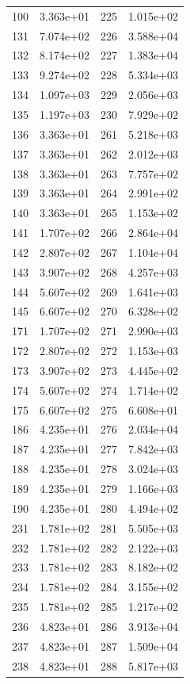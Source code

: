 \documentclass[12pt]{article}
\begin{document}
\begin{longtable}{@{}cccc@{}}
100 & 3.363e+01 & 225 & 1.015e+02 \\
131 & 7.074e+02 & 226 & 3.588e+04 \\
132 & 8.174e+02 & 227 & 1.383e+04 \\
133 & 9.274e+02 & 228 & 5.334e+03 \\
134 & 1.097e+03 & 229 & 2.056e+03 \\
135 & 1.197e+03 & 230 & 7.929e+02 \\
136 & 3.363e+01 & 261 & 5.218e+03 \\
137 & 3.363e+01 & 262 & 2.012e+03 \\
138 & 3.363e+01 & 263 & 7.757e+02 \\
139 & 3.363e+01 & 264 & 2.991e+02 \\
140 & 3.363e+01 & 265 & 1.153e+02 \\
141 & 1.707e+02 & 266 & 2.864e+04 \\
142 & 2.807e+02 & 267 & 1.104e+04 \\
143 & 3.907e+02 & 268 & 4.257e+03 \\
144 & 5.607e+02 & 269 & 1.641e+03 \\
145 & 6.607e+02 & 270 & 6.328e+02 \\
171 & 1.707e+02 & 271 & 2.990e+03 \\
172 & 2.807e+02 & 272 & 1.153e+03 \\
173 & 3.907e+02 & 273 & 4.445e+02 \\
174 & 5.607e+02 & 274 & 1.714e+02 \\
175 & 6.607e+02 & 275 & 6.608e+01 \\
186 & 4.235e+01 & 276 & 2.034e+04 \\
187 & 4.235e+01 & 277 & 7.842e+03 \\
188 & 4.235e+01 & 278 & 3.024e+03 \\
189 & 4.235e+01 & 279 & 1.166e+03 \\
190 & 4.235e+01 & 280 & 4.494e+02 \\
231 & 1.781e+02 & 281 & 5.505e+03 \\
232 & 1.781e+02 & 282 & 2.122e+03 \\
233 & 1.781e+02 & 283 & 8.182e+02 \\
234 & 1.781e+02 & 284 & 3.155e+02 \\
235 & 1.781e+02 & 285 & 1.217e+02 \\
236 & 4.823e+01 & 286 & 3.913e+04 \\
237 & 4.823e+01 & 287 & 1.509e+04 \\
238 & 4.823e+01 & 288 & 5.817e+03 \\

\end{longtable}
\end{document}

